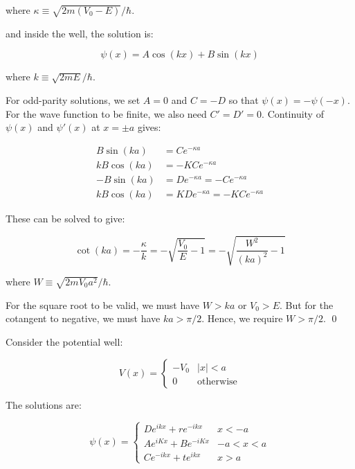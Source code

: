 \documentclass[12pt]{article}
\begin{document}
where $\kappa \equiv \sqrt{2m(V_{0} - E)}/\hbar$.

and inside the well, the solution is:

\begin{equation}
    \psi(x) = A\cos{(kx)} + B\sin{(kx)}
\end{equation}

where $k \equiv \sqrt{2mE}/\hbar$.

For odd-parity solutions, we set $A = 0$ and $C = -D$ so that $\psi(x) = -\psi(-x)$. For the wave function to be finite, we also need $C' = D' = 0$. Continuity of $\psi(x)$ and $\psi'(x)$ at $x = \pm a$ gives:

\begin{equation}
    \begin{split}
        B\sin{(ka)} &= Ce^{-\kappa a} \\
        kB\cos{(ka)} &= -KCe^{-\kappa a} \\
        -B\sin{(ka)} &= De^{-\kappa a} = -Ce^{-\kappa a} \\
        kB\cos{(ka)} &= KDe^{-\kappa a} = -KCe^{-\kappa a}
    \end{split}
\end{equation}

These can be solved to give:

\begin{equation}
    \cot{(ka)} = -\frac{\kappa}{k} = -\sqrt{\frac{V_{0}}{E} - 1} = -\sqrt{\frac{W^{2}}{(ka)^{2}} - 1}
\end{equation}

where $W \equiv \sqrt{2mV_{0}a^{2}}/\hbar$.

For the square root to be valid, we must have $W > ka$ or $V_{0} > E$. But for the cotangent to negative, we must have $ka > \pi/2$. Hence, we require $W > \pi/2$.
\qed


Consider the potential well:

\begin{equation}
    V(x) =
    \begin{cases}
        -V_{0} & \left\lvert x \right\rvert < a \\
        0      & \text{otherwise}
    \end{cases}
\end{equation}

The solutions are:

\begin{equation}
    \psi(x) =
    \begin{cases}
        De^{ikx} + re^{-ikx} & x < -a     \\
        Ae^{iKx} + Be^{-iKx} & -a < x < a \\
        Ce^{-ikx} + te^{ikx} & x > a
    \end{cases}
\end{equation}
\end{document}
